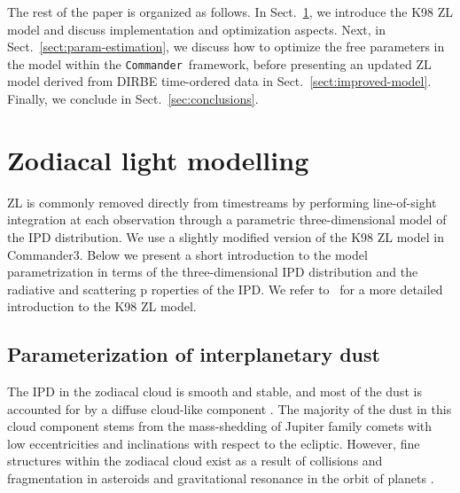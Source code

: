 \documentclass[twocolumn]{aa}
\def\commander{\texttt{Commander}}
\begin{document}
The rest of the paper is organized as follows. In
Sect.~\ref{sect:zodi-model}, we introduce the K98 ZL model and discuss
implementation and optimization aspects. Next, in
Sect.~\ref{sect:param-estimation}, we discuss how to optimize the free
parameters in the model within the \commander\ framework, before
presenting an updated ZL model derived from DIRBE time-ordered data in
Sect.~\ref{sect:improved-model}. Finally, we conclude in Sect.~\ref{sec:conclusions}.


\section{Zodiacal light modelling}\label{sect:zodi-model}
ZL is commonly removed directly from timestreams by performing 
line-of-sight integration at each observation through a parametric 
three-dimensional model of the IPD distribution. We use a slightly 
modified version of the K98 ZL model in Commander3. Below we present a 
short introduction to the model parametrization in terms of the 
three-dimensional IPD distribution and the radiative and scattering p
roperties of the IPD. We refer to~\cite{Kelsall1998} for a more detailed 
introduction to the K98 ZL model.


\subsection{Parameterization of interplanetary dust}
The IPD in the zodiacal cloud is smooth and stable, and most of the dust 
is accounted for by a diffuse cloud-like component \citep{Leinert1998}. 
The majority of the dust in this cloud component stems from the 
mass-shedding of Jupiter family comets with low eccentricities and 
inclinations with respect to the ecliptic. However, fine structures 
within the zodiacal cloud exist as a result of collisions and 
fragmentation in asteroids and gravitational resonance in the orbit of 
planets \citep{Low1984, Dermott1984, Dermott1994, Reach1997}. 
\end{document}
